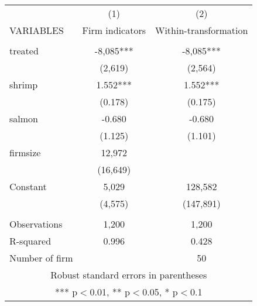 \begin{tabular}{lcc} \hline
 & (1) & (2) \\
VARIABLES & Firm indicators & Within-transformation \\ \hline
 &  &  \\
treated & -8,085*** & -8,085*** \\
 & (2,619) & (2,564) \\
shrimp & 1.552*** & 1.552*** \\
 & (0.178) & (0.175) \\
salmon & -0.680 & -0.680 \\
 & (1.125) & (1.101) \\
firmsize & 12,972 &  \\
 & (16,649) &  \\
Constant & 5,029 & 128,582 \\
 & (4,575) & (147,891) \\
 &  &  \\
Observations & 1,200 & 1,200 \\
R-squared & 0.996 & 0.428 \\
 Number of firm &  & 50 \\ \hline
\multicolumn{3}{c}{ Robust standard errors in parentheses} \\
\multicolumn{3}{c}{ *** p$<$0.01, ** p$<$0.05, * p$<$0.1} \\
\end{tabular}
